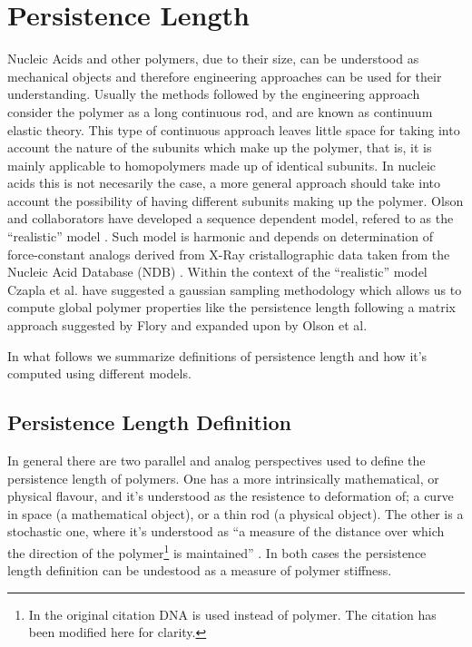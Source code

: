 \chapter{Persistence Length}
\label{appendix4a}

Nucleic Acids and other polymers, due to their size, can be understood
as  mechanical  objects  \cite{marko2003,  nelson2004}  and  therefore
engineering approaches  can be used for  their understanding.  Usually
the methods followed by  the engineering approach consider the polymer
as  a  long  continuous  rod,  and  are  known  as  continuum  elastic
theory.  This type  of  continuous approach  leaves  little space  for
taking  into account  the nature  of the  subunits which  make  up the
polymer, that is,  it is mainly applicable to  homopolymers made up of
identical subunits. In nucleic acids  this is not necesarily the case,
a more  general approach should  take into account the  possibility of
having  different   subunits  making   up  the  polymer.    Olson  and
collaborators have developed a sequence dependent model, refered to as
the ``realistic'' model \cite{olson1993}.   Such model is harmonic and
depends on determination of  force-constant analogs derived from X-Ray
cristallographic  data  taken from  the  Nucleic  Acid Database  (NDB)
\cite{go1976,  olson1998}.  Within  the context  of  the ``realistic''
model  Czapla  et al.   \cite{czapla2006}  have  suggested a  gaussian
sampling  methodology  which  allows  us  to  compute  global  polymer
properties  like  the  persistence  length  following  a  matrix
approach  suggested by  Flory  \cite{flory1969} and  expanded upon  by
Olson et al. \cite{maroun1988a, marky1994a}

In what follows we summarize definitions of persistence length and how
it's computed using different models.

\section{Persistence Length Definition}
In  general there  are two  parallel and  analog perspectives  used to
define  the persistence  length  of  polymers.   One  has a  more
intrinsically mathematical,  or physical flavour,  and it's understood
as the resistence to deformation  of; a curve in space (a mathematical
object), or a thin rod (a physical object).  The other is a stochastic
one, where it's  understood as ``a measure of  the distance over which
the direction of the  polymer\footnote{In the original citation DNA is
  used instead of polymer. The citation has been modified here for
  clarity.} is maintained'' \cite{olson1995}.  In both cases the
persistence length definition can be undestood as a measure of polymer
stiffness.

